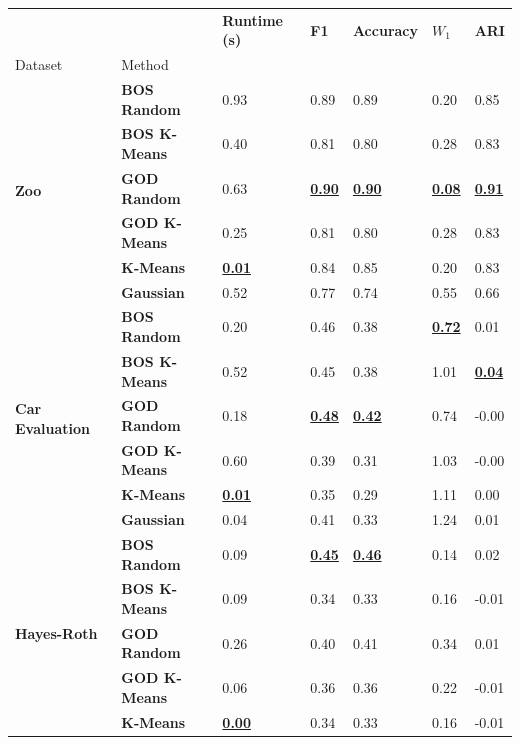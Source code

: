\begin{table}
\begin{adjustbox}{width=\columnwidth}
\begin{tabular}{lllllll}
\toprule
 &  & \textbf{Runtime (s)} & \textbf{F1} & \textbf{Accuracy} & $W_1$ & \textbf{ARI} \\
Dataset & Method &  &  &  &  &  \\
\midrule
\multirow[t]{6}{*}{\textbf{Zoo}} & \textbf{BOS Random} & 0.93 & 0.89 & 0.89 & 0.20 & 0.85 \\
\textbf{} & \textbf{BOS K-Means} & 0.40 & 0.81 & 0.80 & 0.28 & 0.83 \\
\textbf{} & \textbf{GOD Random} & 0.63 & \textbf{\underline{0.90}} & \textbf{\underline{0.90}} & \textbf{\underline{0.08}} & \textbf{\underline{0.91}} \\
\textbf{} & \textbf{GOD K-Means} & 0.25 & 0.81 & 0.80 & 0.28 & 0.83 \\
\textbf{} & \textbf{K-Means} & \textbf{\underline{0.01}} & 0.84 & 0.85 & 0.20 & 0.83 \\
\textbf{} & \textbf{Gaussian} & 0.52 & 0.77 & 0.74 & 0.55 & 0.66 \\
\cline{1-7}
    \multirow[t]{6}{*}{\textbf{Car Evaluation}} & \textbf{BOS Random} & 0.20 & 0.46 & 0.38 & \textbf{\underline{0.72}} & 0.01 \\
    \textbf{} & \textbf{BOS K-Means} & 0.52 & 0.45 & 0.38 & 1.01 & \textbf{\underline{0.04}} \\
\textbf{} & \textbf{GOD Random} & 0.18 & \textbf{\underline{0.48}} & \textbf{\underline{0.42}} & 0.74 & -0.00 \\
\textbf{} & \textbf{GOD K-Means} & 0.60 & 0.39 & 0.31 & 1.03 & -0.00 \\
    \textbf{} & \textbf{K-Means} & \textbf{\underline{0.01}} & 0.35 & 0.29 & 1.11 & 0.00 \\
\textbf{} & \textbf{Gaussian} & 0.04 & 0.41 & 0.33 & 1.24 & 0.01 \\
\cline{1-7}
    \multirow[t]{6}{*}{\textbf{Hayes-Roth}} & \textbf{BOS Random} & 0.09 & \textbf{\underline{0.45}} & \textbf{\underline{0.46}} & 0.14 & 0.02 \\
\textbf{} & \textbf{BOS K-Means} & 0.09 & 0.34 & 0.33 & 0.16 & -0.01 \\
\textbf{} & \textbf{GOD Random} & 0.26 & 0.40 & 0.41 & 0.34 & 0.01 \\
\textbf{} & \textbf{GOD K-Means} & 0.06 & 0.36 & 0.36 & 0.22 & -0.01 \\
\textbf{} & \textbf{K-Means} & \textbf{\underline{0.00}} & 0.34 & 0.33 & 0.16 & -0.01 \\

\end{tabular}
\end{adjustbox}
\end{table}
